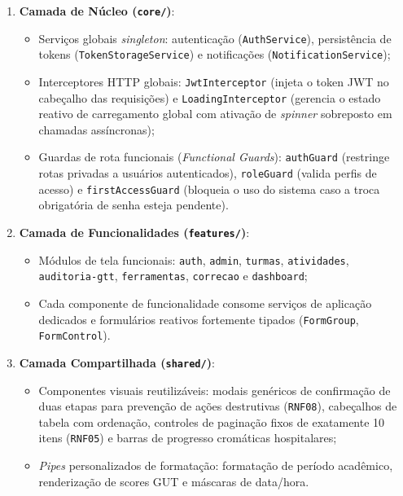 \begin{enumerate}
    \item \textbf{Camada de Núcleo (\texttt{core/})}:
    \begin{itemize}
        \item Serviços globais \textit{singleton}: autenticação (\texttt{AuthService}), persistência de tokens (\texttt{Token\-Storage\-Service}) e notificações (\texttt{Notification\-Service});
        \item Interceptores HTTP globais: \texttt{JwtInterceptor} (injeta o token JWT no cabeçalho das requisições) e \texttt{LoadingInterceptor} (gerencia o estado reativo de carregamento global com ativação de \textit{spinner} sobreposto em chamadas assíncronas);
        \item Guardas de rota funcionais (\textit{Functional Guards}): \texttt{authGuard} (restringe rotas privadas a usuários autenticados), \texttt{roleGuard} (valida perfis de acesso) e \texttt{firstAccessGuard} (bloqueia o uso do sistema caso a troca obrigatória de senha esteja pendente).
    \end{itemize}

    \item \textbf{Camada de Funcionalidades (\texttt{features/})}:
    \begin{itemize}
        \item Módulos de tela funcionais: \texttt{auth}, \texttt{admin}, \texttt{turmas}, \texttt{atividades}, \texttt{auditoria-gtt}, \texttt{ferramentas}, \texttt{correcao} e \texttt{dashboard};
        \item Cada componente de funcionalidade consome serviços de aplicação dedicados e formulários reativos fortemente tipados (\texttt{FormGroup}, \texttt{FormControl}).
    \end{itemize}

    \item \textbf{Camada Compartilhada (\texttt{shared/})}:
    \begin{itemize}
        \item Componentes visuais reutilizáveis: modais genéricos de confirmação de duas etapas para prevenção de ações destrutivas (\texttt{RNF08}), cabeçalhos de tabela com ordenação, controles de paginação fixos de exatamente 10 itens (\texttt{RNF05}) e barras de progresso cromáticas hospitalares;
        \item \textit{Pipes} personalizados de formatação: formatação de período acadêmico, renderização de scores GUT e máscaras de data/hora.
    \end{itemize}
\end{enumerate}

